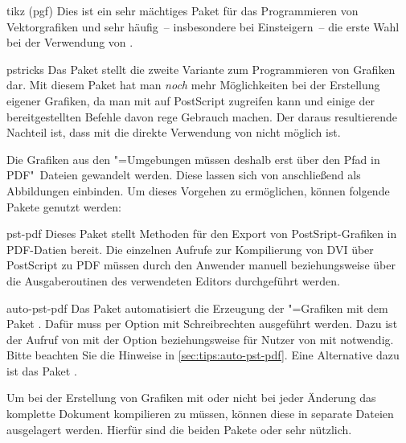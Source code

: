 \begin{packages}
\item[tikz](pgf)
  Dies ist ein sehr mächtiges Paket für das Programmieren von Vektorgrafiken 
  und sehr häufig~-- insbesondere bei Einsteigern~-- die erste Wahl bei der 
  Verwendung von .
\item[pstricks]
  Das Paket  stellt die zweite Variante zum Programmieren 
  von Grafiken dar. Mit diesem Paket hat man \emph{noch} mehr Möglichkeiten bei 
  der Erstellung eigener Grafiken, da man mit  auf 
  PostScript zugreifen kann und einige der bereitgestellten Befehle davon rege 
  Gebrauch machen. Der daraus resultierende Nachteil ist, dass mit 
   die direkte Verwendung von  nicht 
  möglich ist.
  
  Die Grafiken aus den "=Umgebungen müssen deshalb erst 
  über den Pfad 
  in PDF"~Dateien gewandelt werden. Diese lassen sich von  
  anschließend als Abbildungen einbinden. Um dieses Vorgehen zu ermöglichen, 
  können folgende Pakete genutzt werden:
  \begin{packages}
  \item[pst-pdf]
    Dieses Paket stellt Methoden für den Export von PostSript-Grafiken in 
    PDF-Datien bereit. Die einzelnen Aufrufe zur Kompilierung von DVI über 
    PostScript zu PDF müssen durch den Anwender manuell beziehungsweise über 
    die Ausgaberoutinen des verwendeten Editors durchgeführt werden.
  \item[auto-pst-pdf]
    Das Paket automatisiert die Erzeugung der "=Grafiken mit 
    dem Paket . Dafür muss  per Option mit 
    Schreibrechten ausgeführt werden. Dazu ist der Aufruf von  
    mit der Option  beziehungsweise für Nutzer von 
     mit  notwendig. 
    Bitte beachten Sie die Hinweise in \autoref{sec:tips:auto-pst-pdf}. Eine 
    Alternative dazu ist das Paket .
  \end{packages}
\end{packages}
%
Um bei der Erstellung von Grafiken mit  oder  
nicht bei jeder Änderung das komplette Dokument kompilieren zu müssen, können 
diese in separate Dateien ausgelagert werden. Hierfür sind die beiden Pakete 
 oder  sehr nützlich.

